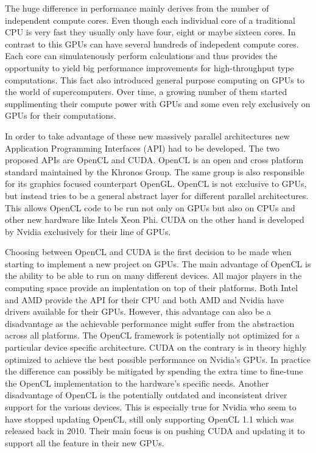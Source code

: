 \documentclass[a4paper,11pt]{kth-mag}
\begin{document}
The huge difference in performance mainly derives from the number of independent compute cores. Even though each individual core of a traditional CPU is very fast they usually only have four, eight or maybe sixteen cores. In contrast to this GPUs can have several hundreds of indepedent compute cores. Each core can simulatenously perform calculations and thus provides the opportunity to yield big performance improvements for high-throughput type computations. This fact also introduced general purpose computing on GPUs to the world of supercomputers. Over time, a growing number of them started supplimenting their compute power with GPUs and some even rely exclusively on GPUs for their computations.

In order to take advantage of these new massively parallel architectures new Application Programming Interfaces (API) had to be developed. The two proposed APIs are OpenCL and CUDA. OpenCL is an open and cross platform standard maintained by the Khronos Group. The same group is also responsible for its graphics focused counterpart OpenGL. OpenCL is not exclusive to GPUs, but instead tries to be a general abstract layer for different parallel architectures. This allows OpenCL code to be run not only on GPUs but also on CPUs and other new hardware like Intels Xeon Phi. CUDA on the other hand is developed by Nvidia exclusively for their line of GPUs.

Choosing between OpenCL and CUDA is the first decision to be made when starting to implement a new project on GPUs. The main advantage of OpenCL is the ability to be able to run on many different devices. All major players in the computing space provide an implentation on top of their platforms. Both Intel and AMD provide the API for their CPU and both AMD and Nvidia have drivers available for their GPUs. However, this advantage can also be a disadvantage as the achievable performance might suffer from the abstraction across all platforms. The OpenCL framework is potentially not optimized for a particular device specific architecture. CUDA on the contrary is in theory highly optimized to achieve the best possible performance on Nvidia's GPUs. In practice the difference can possibly be mitigated by spending the extra time to fine-tune the OpenCL implementation to the hardware's specific needs. Another disadvantage of OpenCL is the potentially outdated and inconsistent driver support for the various devices. This is especially true for Nvidia who seem to have stopped updating OpenCL, still only supporting OpenCL 1.1 which was released back in 2010. Their main focus is on pushing CUDA and updating it to support all the feature in their new GPUs.
\end{document}
